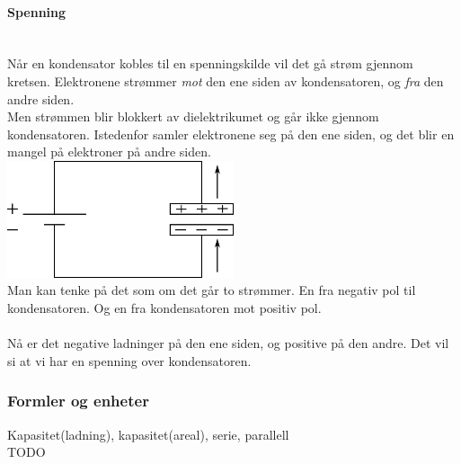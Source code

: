 \paragraph{Spenning} \mbox{} \\
Når en kondensator kobles til en spenningskilde
vil det gå strøm gjennom kretsen.
Elektronene strømmer \emph{mot} den ene siden av kondensatoren,
og \emph{fra} den andre siden.
\\
Men strømmen blir blokkert av dielektrikumet
og går ikke gjennom kondensatoren.
Istedenfor samler elektronene seg på den ene siden,
og det blir en mangel på elektroner på andre siden.
\\
\includegraphics[width=0.5\textwidth]{./img/kondensator-ladning}
\\
Man kan tenke på det som om det går to strømmer.
En fra negativ pol til kondensatoren.
Og en fra kondensatoren mot positiv pol.
\\\\
Nå er det negative ladninger på den ene siden,
og positive på den andre.
Det vil si at vi har en spenning over kondensatoren.



\subsubsection{Formler og enheter}
Kapasitet(ladning), kapasitet(areal), serie, parallell \\
TODO
